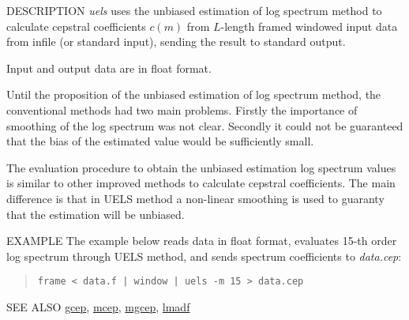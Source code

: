 \begin{synopsis}
\item [uels] [ --m $M$ ] [ --l $L$ ] [ --i $I$ ] 
	     [ --j $J$ ] [ --d $D$ ] [ --e $E$ ] [ {\em infile} ]
\end{synopsis}

\begin{qsection}{DESCRIPTION}
{\em uels} uses the unbiased estimation of log spectrum method 
to calculate cepstral coefficients $c(m)$ 
from $L$-length framed windowed input data
from {\rm infile} (or standard input), 
sending the result to standard output.

Input and output data are in float format.

Until the proposition of the unbiased estimation of
log spectrum method, the conventional methods had
two main problems.
Firstly the importance of smoothing of the log spectrum
was not clear.
Secondly it could not be guaranteed that
the bias of the estimated value would be sufficiently small.

The evaluation procedure to obtain the unbiased estimation
log spectrum values is similar to other improved methods to
calculate cepstral coefficients.
The main difference is that in UELS method a non-linear smoothing
is used to guaranty that the estimation will be unbiased.
\end{qsection}

\begin{options}
\end{options}

\begin{qsection}{EXAMPLE}
The example below reads data in float format,
evaluates 15-th order log spectrum through UELS method,
and sends spectrum coefficients to {\em data.cep}:
\begin{quote}
 \verb!frame < data.f | window | uels -m 15 > data.cep!
\end{quote} 
\end{qsection}

\begin{qsection}{SEE ALSO}
\hyperlink{gcep}{gcep},
\hyperlink{mcep}{mcep},
\hyperlink{mgcep}{mgcep},
\hyperlink{lmadf}{lmadf}
\end{qsection}
